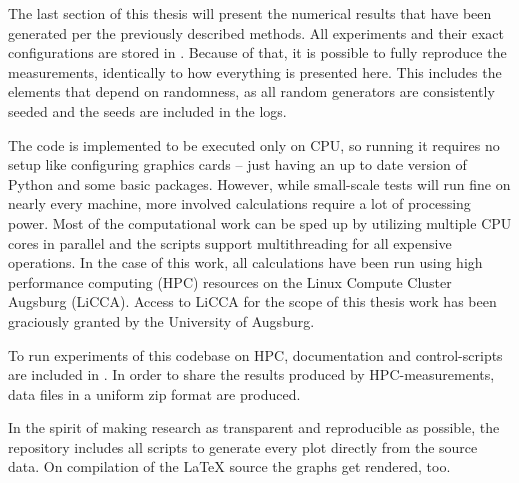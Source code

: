 The last section of this thesis will present the numerical results that have been generated per the previously described methods.
All experiments and their exact configurations are stored in 
.
Because of that, it is possible to fully reproduce the measurements, identically to how everything is presented here.
This includes the elements that depend on randomness, as all random generators are consistently seeded and the seeds are included in the logs.

The code is implemented to be executed only on CPU, so running it requires no setup like configuring graphics cards -- just having an up to date version of Python and some basic packages.
However, while small-scale tests will run fine on nearly every machine, more involved calculations require a lot of processing power.
Most of the computational work can be sped up by utilizing multiple CPU cores in parallel and the scripts support multithreading for all expensive operations.
In the case of this work, all calculations have been run using high performance computing (HPC) resources on the Linux Compute Cluster Augsburg (LiCCA).
Access to LiCCA for the scope of this thesis work has been graciously granted by the University of Augsburg.

To run experiments of this codebase on HPC, documentation and control-scripts are included in .
In order to share the results produced by HPC-measurements, data files in a uniform zip format are produced.

In the spirit of making research as transparent and reproducible as possible, the repository  includes all scripts to generate every plot directly from the source data.
On compilation of the \LaTeX{} source the graphs get rendered, too.
